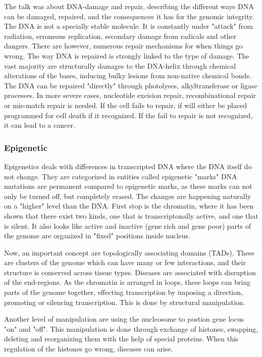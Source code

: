 \documentclass[12p]{article}
\begin{document}
The talk was about DNA-damage and repair, describing the different ways DNA can be damaged, repaired, and the consequences it has for the genomic integrity.
The DNA is not a specially stable molecule.
It is constantly under "attack" from radiation, erroneous replication, secondary damage from radicals and other dangers.
There are however, numerous repair mechanisms for when things go wrong.
The way DNA is repaired is strongly linked to the type of damage.
The vast majority are structurally damages to the DNA-helix through chemical alterations of the bases, inducing bulky lesions from non-native chemical bonds.
The DNA can be repaired "directly" through photolyses, alkyltransferase or ligase processes.
In more severe cases, nucleotide excision repair, recombinational repair or mis-match repair is needed.
If the cell fails to repair, if will either be placed programmed for cell death if it recognized.
If the fail to repair is not recognized, it can lead to a cancer.

\subsubsection*{Epigenetic}

Epigenetics deals with differences in transcripted DNA where the DNA itself do not change.
They are categorized in entities called epigenetic "marks"
DNA mutations are permanent compared to epigenetic marks, as these marks can not only be turned off, but completely erased.
The changes are happening naturally on a "higher" level than the DNA.
First stop is the chromatin, where it has been shown that there exist two kinds, one that is transcriptonally active, and one that is silent.
It also looks like active and inactive (gene rich and gene poor) parts of the genome are organized in "fixed" positions inside nucleus.

Now, an important concept are topologically associating domains (TADs).
These are clusters of the genome which can have many or few interactions, and their structure is conserved across tissue types.
Diseases are associated with disruption of the end-regions.
As the chromatin is arranged in loops, these loops can bring parts of the genome together, effecting transcription by imposing a direction, promoting or silencing transcription.
This is done by structural manipulation.

Another level of manipulation are using the nucleosome to postion gene locus "on" and "off".
This manipulation is done through exchange of histones, swapping, deleting and reorganizing them with the help of special proteins.
When this regulation of the histones go wrong, diseases can arise.
\end{document}
